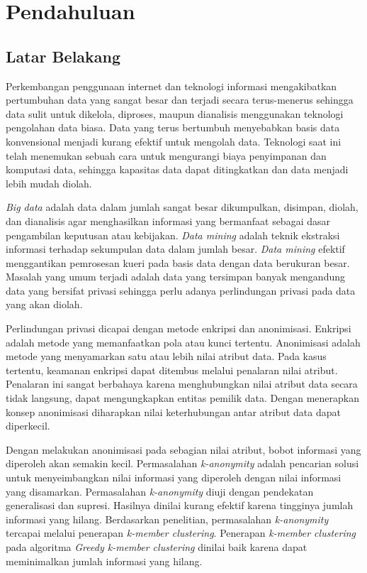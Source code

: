 \chapter{Pendahuluan}
\label{chap:intro}
   
\section{Latar Belakang}
\label{sec:label}
Perkembangan penggunaan internet dan teknologi informasi mengakibatkan pertumbuhan data yang sangat besar dan terjadi secara terus-menerus sehingga data sulit untuk dikelola, diproses, maupun dianalisis menggunakan teknologi pengolahan data biasa. Data yang terus bertumbuh menyebabkan basis data konvensional menjadi kurang efektif untuk mengolah data. Teknologi saat ini telah menemukan sebuah cara untuk mengurangi biaya penyimpanan dan komputasi data, sehingga kapasitas data dapat ditingkatkan dan data menjadi lebih mudah diolah.

{\it Big data} adalah data dalam jumlah sangat besar dikumpulkan, disimpan, diolah, dan dianalisis agar menghasilkan informasi yang bermanfaat sebagai dasar pengambilan keputusan atau kebijakan. {\it Data mining} adalah teknik ekstraksi informasi terhadap sekumpulan data dalam jumlah besar. {\it Data mining} efektif menggantikan pemrosesan kueri pada basis data dengan data berukuran besar. Masalah yang umum terjadi adalah data yang tersimpan banyak mengandung data yang bersifat privasi sehingga perlu adanya perlindungan privasi pada data yang akan diolah.

Perlindungan privasi dicapai dengan metode enkripsi dan anonimisasi. Enkripsi adalah metode yang memanfaatkan pola atau kunci tertentu. Anonimisasi adalah metode yang menyamarkan satu atau lebih nilai atribut data. Pada kasus tertentu, keamanan enkripsi dapat ditembus melalui penalaran nilai atribut. Penalaran ini sangat berbahaya karena menghubungkan nilai atribut data secara tidak langsung, dapat mengungkapkan entitas pemilik data. Dengan menerapkan konsep anonimisasi diharapkan nilai keterhubungan antar atribut data dapat diperkecil.

Dengan melakukan anonimisasi pada sebagian nilai atribut, bobot informasi yang diperoleh akan semakin kecil. Permasalahan {\it k-anonymity} adalah pencarian solusi untuk menyeimbangkan nilai informasi yang diperoleh dengan nilai informasi yang disamarkan. Permasalahan {\it k-anonymity} diuji dengan pendekatan generalisasi dan supresi. Hasilnya dinilai kurang efektif karena tingginya jumlah informasi yang hilang. Berdasarkan penelitian, permasalahan {\it k-anonymity} tercapai melalui penerapan {\it k-member clustering}. Penerapan {\it k-member clustering} pada algoritma {\it Greedy k-member clustering} dinilai baik karena dapat meminimalkan jumlah informasi yang hilang.

